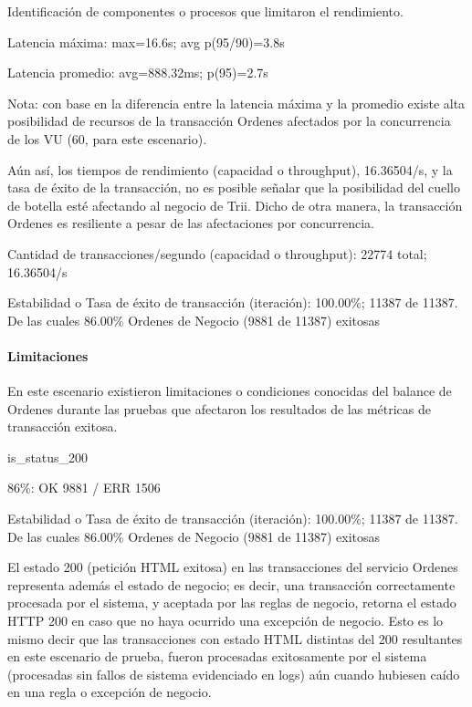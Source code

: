 \documentclass[
  paper=a4,
  ,captions=tableheading
]{scrartcl}
\renewenvironment{quote}{\begin{customblockquote}\list{}{\rightmargin=0em\leftmargin=0em}%
\item\relax\color{blockquote-text}\ignorespaces}{\unskip\unskip\endlist\end{customblockquote}}
\begin{document}
Identificación de componentes o procesos que limitaron el rendimiento.

\begin{quote}
Latencia máxima: max=16.6s; avg p(95/90)=3.8s

Latencia promedio: avg=888.32ms; p(95)=2.7s
\end{quote}

Nota: con base en la diferencia entre la latencia máxima y la promedio
existe alta posibilidad de recursos de la transacción Ordenes afectados
por la concurrencia de los VU (60, para este escenario).

Aún así, los tiempos de rendimiento (capacidad o throughput),
16.36504/s, y la tasa de éxito de la transacción, no es posible señalar
que la posibilidad del cuello de botella esté afectando al negocio de
Trii. Dicho de otra manera, la transacción Ordenes es resiliente a pesar
de las afectaciones por concurrencia.

\begin{quote}
Cantidad de transacciones/segundo (capacidad o throughput): 22774 total;
16.36504/s

Estabilidad o Tasa de éxito de transacción (iteración): 100.00\%; 11387
de 11387. De las cuales 86.00\% Ordenes de Negocio (9881 de 11387)
exitosas
\end{quote}

\paragraph{Limitaciones}\label{sec:limitaciones-2}

En este escenario existieron limitaciones o condiciones conocidas del
balance de Ordenes durante las pruebas que afectaron los resultados de
las métricas de transacción exitosa.

\begin{quote}
is\_status\_200

86\%: OK 9881 / ERR 1506

Estabilidad o Tasa de éxito de transacción (iteración): 100.00\%; 11387
de 11387. De las cuales 86.00\% Ordenes de Negocio (9881 de 11387)
exitosas
\end{quote}

El estado 200 (petición HTML exitosa) en las transacciones del servicio
Ordenes representa además el estado de negocio; es decir, una
transacción correctamente procesada por el sistema, y aceptada por las
reglas de negocio, retorna el estado HTTP 200 en caso que no haya
ocurrido una excepción de negocio. Esto es lo mismo decir que las
transacciones con estado HTML distintas del 200 resultantes en este
escenario de prueba, fueron procesadas exitosamente por el sistema
(procesadas sin fallos de sistema evidenciado en logs) aún cuando
hubiesen caído en una regla o excepción de negocio.
\end{document}
